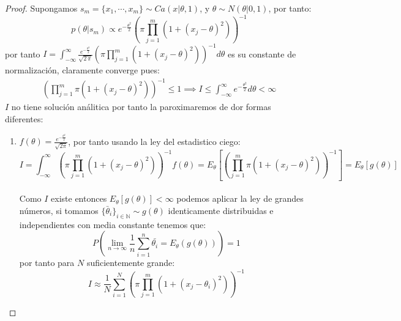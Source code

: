 \documentclass[11pt,letterpaper]{article}
\newcommand{\N}{\mathbb{N}}
\begin{document}
\begin{proof}
    Supongamos $s_m=\{x_1,\cdots,x_m\}\sim Ca(x|\theta,1)$, y $\theta\sim N(\theta|0,1)$, por tanto:\,\\
    \begin{equation*}
        p(\theta|s_m)\varpropto e^{-\frac{\theta^2}{2}}\left(\pi\displaystyle\prod_{j=1}^m(1+(x_j-\theta)^2)\right)^{-1} 
    \end{equation*}
    por tanto $I=\int_{-\infty}^{\infty}\frac{e^{-\frac{\theta^2}{2}}}{\sqrt{2\,\pi}}\left(\pi\displaystyle\prod_{j=1}^m(1+(x_j-\theta)^2)\right)^{-1}d\theta$ es su constante de normalizaci\'on, claramente converge pues:\,\\
    \begin{align*}
        \left(\displaystyle\prod_{j=1}^m\pi(1+(x_j-\theta)^2)\right)^{-1}\leq 1\implies I\leq \int_{-\infty}^{\infty}e^{-\frac{\theta^2}{2}}d\theta<\infty
    \end{align*} 
    $I$ no tiene soluci\'on an\'alitica por tanto la paroximaremos de dor formas diferentes:\,\\
    \begin{enumerate}
        \item $f(\theta)=\frac{e^{-\frac{\theta^2}{2}}}{\sqrt{2\pi}}$, por tanto usando la ley del estadistico ciego:\,\\
        \begin{equation*}
            I=\int_{-\infty}^{\infty}\left(\pi\displaystyle\prod_{j=1}^m(1+(x_j-\theta)^2)\right)^{-1}f(\theta)=E_{\theta}\left[\left(\displaystyle\prod_{j=1}^m\pi(1+(x_j-\theta)^2)\right)^{-1}\right]=E_{\theta}[g(\theta)]
        \end{equation*}\,\\
        Como $I$ existe entonces $E_{\theta}[g(\theta)]<\infty$ podemos aplicar la ley de grandes n\'umeros, si tomamos $\{\bar{\theta}_i\}_{i\in \N}\sim g(\theta) $ identicamente distribuidas e independientes con media constante tenemos que:\,\\
        \begin{equation*}
            P\left(\lim_{n\to\infty}\frac{1}{n}\displaystyle\sum_{i=1}^n \bar{\theta_i}=E_{\theta}(g(\theta))\right)=1
        \end{equation*}
        por tanto para $N$ suficientemente grande:
        \begin{equation*}
            I\approx \displaystyle\frac{1}{N}\sum_{i=1}^{N}\left(\pi\displaystyle\prod_{j=1}^m(1+(x_j-\theta_i)^2)\right)^{-1}
        \end{equation*}
        

\end{enumerate}
\end{proof}
\end{document}
